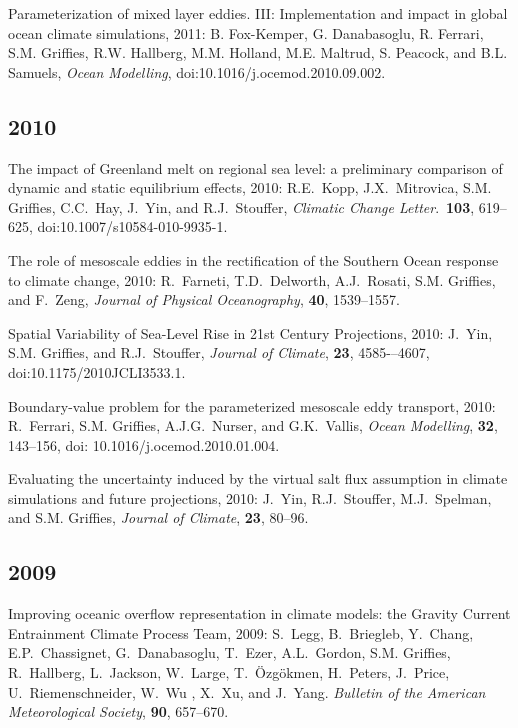 \begin{etaremune}
\item Parameterization of mixed layer eddies. III: Implementation and impact in global ocean climate simulations, 2011: B. Fox-Kemper, G. Danabasoglu, R. Ferrari, S.M. Grif\/f\/ies, R.W. Hallberg, M.M. Holland, M.E. Maltrud, S. Peacock, and B.L. Samuels, {\it Ocean Modelling}, doi:10.1016/j.ocemod.2010.09.002.

\subsection*{\sc \color{Maroon} 2010}

\item The impact of Greenland melt on regional sea level: a preliminary comparison of dynamic and static equilibrium effects, 2010: R.E.\ Kopp, J.X.\ Mitrovica, S.M. Grif\/f\/ies, C.C.\  Hay, J.\ Yin, and R.J.\ Stouffer, {\it Climatic Change Letter}.\,
  {\bf 103}, 619--625, doi:10.1007/s10584-010-9935-1.

\item The role of mesoscale eddies in the rectification of the Southern Ocean response to climate change, 2010: R.\ Farneti, T.D.\  Delworth, A.J.\ Rosati, S.M. Grif\/f\/ies, and F.\ Zeng, {\it Journal of Physical Oceanography}, {\bf 40}, 1539--1557.

\item Spatial Variability of Sea-Level Rise in 21st Century Projections, 2010: J.\ Yin, S.M. Grif\/f\/ies, and R.J.\ Stouffer, {\it Journal of Climate}, {\bf 23}, 4585-–4607, doi:10.1175/2010JCLI3533.1.

\item Boundary-value problem for the parameterized mesoscale eddy transport, 2010: R.\ Ferrari, S.M. Grif\/f\/ies, A.J.G.\  Nurser, and G.K.\ Vallis, {\em Ocean Modelling}, {\bf 32}, 143--156, doi: 10.1016/j.ocemod.2010.01.004.

\item Evaluating the uncertainty induced by the virtual salt flux assumption in climate simulations and future projections, 2010: J.\  Yin, R.J.\ Stouffer, M.J.\ Spelman, and S.M. Grif\/f\/ies, {\em Journal of Climate}, {\bf 23}, 80--96.

\subsection*{\sc \color{Maroon} 2009}


\item Improving oceanic overflow representation in climate models: the   Gravity Current Entrainment Climate Process Team, 2009: S.\ Legg, B.\ Briegleb, Y.\ Chang, E.P.\ Chassignet, G.\ Danabasoglu, T.\
  Ezer, A.L.\ Gordon, S.M. Grif\/f\/ies, R.\ Hallberg, L.\ Jackson, W.\ Large, T.\ \"Ozg\"okmen, H.\ Peters, J.\ Price, U.\
  Riemenschneider, W.\ Wu , X.\ Xu, and J.\ Yang.  {\em Bulletin of the American Meteorological Society}, {\bf 90}, 657--670.


\end{etaremune}
